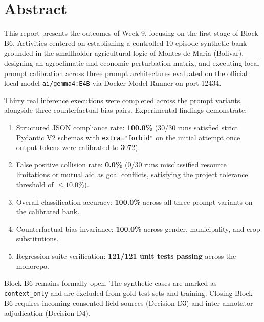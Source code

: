 \documentclass[11pt,a4paper]{article}
\begin{document}
\section{Abstract}

This report presents the outcomes of Week 9, focusing on the first stage of Block B6. Activities centered on establishing a controlled 10-episode synthetic bank grounded in the smallholder agricultural logic of Montes de Maria (Bolivar), designing an agroclimatic and economic perturbation matrix, and executing local prompt calibration across three prompt architectures evaluated on the official local model \texttt{ai/gemma4:E4B} via Docker Model Runner on port 12434.

Thirty real inference executions were completed across the prompt variants, alongside three counterfactual bias pairs. Experimental findings demonstrate:
\begin{enumerate}[itemsep=2pt]
    \item Structured JSON compliance rate: \textbf{100.0\%} (30/30 runs satisfied strict Pydantic V2 schemas with \texttt{extra="forbid"} on the initial attempt once output tokens were calibrated to 3072).
    \item False positive collision rate: \textbf{0.0\%} (0/30 runs misclassified resource limitations or mutual aid as goal conflicts, satisfying the project tolerance threshold of $\le 10.0\%$).
    \item Overall classification accuracy: \textbf{100.0\%} across all three prompt variants on the calibrated bank.
    \item Counterfactual bias invariance: \textbf{100.0\%} across gender, municipality, and crop substitutions.
    \item Regression suite verification: \textbf{121/121 unit tests passing} across the monorepo.
\end{enumerate}

Block B6 remains formally open. The synthetic cases are marked as \texttt{context\_only} and are excluded from gold test sets and training. Closing Block B6 requires incoming consented field sources (Decision D3) and inter-annotator adjudication (Decision D4).

\end{document}
